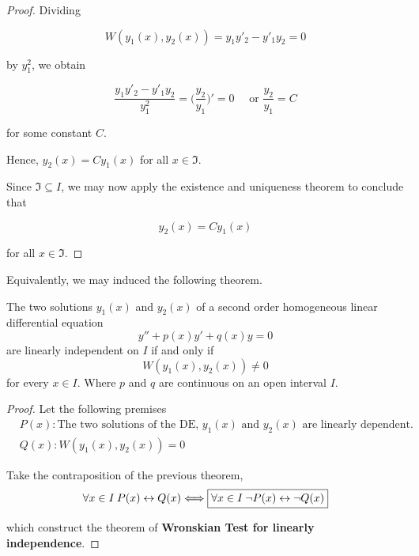 \begin{proof}
     Dividing 

     \[
        W(y_1(x), y_2(x)) = y_1y'_2 - y'_1y_2 = 0
     \]

     by $y_1^2$, we obtain 

     \[
        \frac{y_1y'_2 - y'_1y_2}{y_1^2} = \biggl( \frac{y_2}{y_1} \biggr)' = 0 \quad 
        \text{ or } \frac{y_2}{y_1} = C
     \]

     for some constant $C$. 

     Hence, $y_2(x) = Cy_1(x)$ for all $x \in \mathfrak{I}$.

     Since $\mathfrak{I} \subseteq I$, we may now apply the existence and uniqueness theorem to conclude that 

     \[
        y_2(x) = Cy_1(x)
     \]

     for all $x \in \mathfrak{I}$.
\end{proof}

Equivalently, we may induced the following theorem.

\begin{theorem}
    The two solutions $y_1(x)$ and $y_2(x)$ of a second order homogeneous linear 
    differential equation
    \begin{equation}
        y'' + p(x)y' + q(x)y = 0
    \end{equation}
    are linearly independent on $I$ if and only if 
    \begin{equation}
        W(y_1(x), y_2(x)) \neq 0
    \end{equation}
    for every $x \in I$. Where $p$ and $q$ are continuous on an open interval $I$.
\end{theorem}

\begin{proof}
    Let the following premises
    \begin{align*}
        &P(x): \text{The two solutions of the DE, } y_1(x) \text{ and } y_2(x) \text{ are linearly dependent.}\\
        &Q(x): W(y_1(x), y_2(x)) = 0
    \end{align*}

    Take the contraposition of the previous theorem,
    \begin{equation}
        \forall x \in I \> P(x) \leftrightarrow Q(x) \Longleftrightarrow \fbox{$\forall x \in I \> \lnot P(x) \leftrightarrow \lnot Q(x)$}
    \end{equation}

    which construct the theorem of \textbf{Wronskian Test for linearly independence}.
\end{proof}


